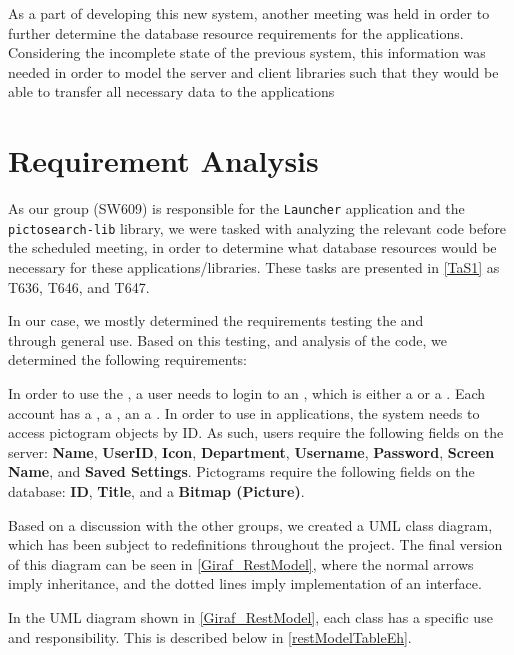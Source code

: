 As a part of developing this new system, another meeting was held in order to further
determine the database resource requirements for the applications. Considering the
incomplete state of the previous system, this information was needed in order to
model the server and client libraries such that they would be able to transfer all
necessary data to the applications

\section{Requirement Analysis}
As our group (SW609) is responsible for the \texttt{Launcher} application and
the \\\texttt{pictosearch-lib} library, we were tasked with analyzing the
relevant code before the scheduled meeting, in order to determine what database resources
would be necessary for these applications/libraries. These tasks are presented
in \autoref{TaS1} as T636, T646, and T647.\nl

In our case, we mostly determined the requirements testing the 
and\\  through general use. Based on this testing, and
analysis of the code, we determined the following requirements:\nl

In order to use the , a user needs to login to an
, which is either a  or a . Each
account has a , a , an a .
In order to use  in applications, the system needs to access
pictogram objects by ID. As such, users require the following fields on the
server: \textbf{Name}, \textbf{UserID}, \textbf{Icon}, \textbf{Department},
\textbf{Username}, \textbf{Password}, \textbf{Screen Name}, and \textbf{Saved
Settings}.
Pictograms require the following fields on the database: \textbf{ID},
\textbf{Title}, and a \textbf{Bitmap (Picture)}.\nl

Based on a discussion with the other groups, we created a UML class diagram,
which has been subject to redefinitions throughout the project. The final
version of this diagram can be seen in \autoref{Giraf_RestModel}, where the
normal arrows imply inheritance, and the dotted lines imply implementation of an
interface.


In the UML diagram shown in \autoref{Giraf_RestModel}, each class has a
specific use and responsibility. This is described below in
\autoref{restModelTableEh}.

